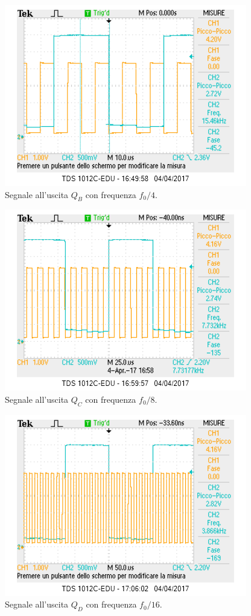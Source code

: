 \documentclass[10pt,a4paper]{article}
\begin{document}
\begin{figure}
\centering
\includegraphics[scale=1.0]{QB1-4.png}
\caption{Segnale all'uscita $Q_B$ con frequenza $f_0/4$.\label{freq4}}
\end{figure}

\begin{figure}
\centering
\includegraphics[scale=1.0]{QC1-8.png}
\caption{Segnale all'uscita $Q_C$ con frequenza $f_0/8$.\label{freq8}}
\end{figure}

\begin{figure}
\centering
\includegraphics[scale=1.0]{QD1-16.png}
\caption{Segnale all'uscita $Q_D$ con frequenza $f_0/16$.\label{freq16}}
\end{figure}
\end{document}
